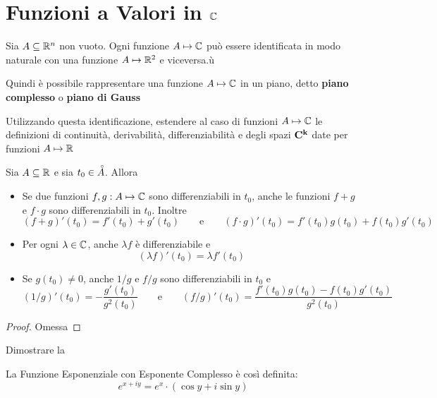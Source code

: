 \newpage
\section{Funzioni a Valori in \texorpdfstring{$\protect\mathbb{C}$}{C}}\label{sect:fun_in_C}
Sia $A \subseteq \mathbb{R}^n$ non vuoto. Ogni funzione $A \mapsto \mathbb{C}$ può essere identificata in modo naturale con una funzione $A \mapsto \mathbb{R}^2$ e viceversa.ù
\begin{note}
	Quindi è possibile rappresentare una funzione $A \mapsto \mathbb{C}$ in un piano, detto \textbf{piano complesso} o \textbf{piano di Gauss}
\end{note}
\begin{exercise}
	\label{ex:ext_def_in_C}
	Utilizzando questa identificazione, estendere al caso di funzioni $A \mapsto \mathbb{C}$ le definizioni di continuità, derivabilità, differenziabilità e degli spazi $\mathbf{C^{k}}$ date per funzioni $A \mapsto \mathbb{R}$
\end{exercise}
\begin{proposition}
	\label{prop:fg_in_C}
	Sia $A \subseteq \mathbb{R}$ e sia $t_0 \in \accentset{\circ}{A}$. Allora
	\begin{itemize}
		\item Se due funzioni $f,g: A \mapsto \mathbb{C}$ sono differenziabili in $t_0$, anche le funzioni $f+g$ e $f \cdot g$ sono differenziabili in $t_0$. Inoltre
			\[(f+g)'(t_0) = f'(t_0) + g'(t_0) \qquad\text{e}\qquad (f \cdot g)'(t_0) = f'(t_0)g(t_0)+f(t_0)g'(t_0)\]
		\item Per ogni $\lambda \in \mathbb{C}$, anche $\lambda f$ è differenziabile e
			\[(\lambda f)'(t_0) = \lambda f'(t_0)\]
		\item Se $g(t_0) \neq 0$, anche $1/g$ e $f/g$ sono differenziabili in $t_0$ e
			\[(1/g)'(t_0) = - \frac{g'(t_0)}{g^2(t_0)} \qquad\text{e}\qquad (f/g)'(t_0) = \frac{f'(t_0)g(t_0)-f(t_0)g'(t_0)}{g^2(t_0)}\]
	\end{itemize}
	\begin{proof}
		Omessa
	\end{proof}
\end{proposition}
\begin{exercise}
	Dimostrare la 
\end{exercise}
\begin{definition}
	\label{def:exp_complesso}
	La Funzione Esponenziale con Esponente Complesso è così definita:
	\[e^{x+iy} = e^x \cdot (\cos y + i \sin y)\]
\end{definition}
